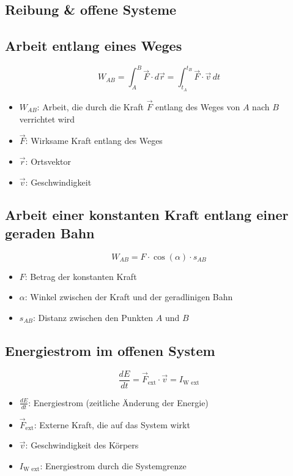 \documentclass[a4paper, 8pt]{extarticle}
\begin{document}
\begin{landscape}
\begin{multicols*}{3}
\section{Reibung
\& offene Systeme}

\subsection{Arbeit entlang eines Weges}
\[
W_{AB} = \int_A^B \vec{F} \cdot d\vec{r} = \int_{t_A}^{t_B} \vec{F} \cdot \vec{v} \, dt
\]
{\footnotesize
\begin{itemize}
    \item \( W_{AB} \): Arbeit, die durch die Kraft \( \vec{F} \) entlang des Weges von \( A \) nach \( B \) verrichtet wird
    \item \( \vec{F} \): Wirksame Kraft entlang des Weges
    \item \( \vec{r} \): Ortsvektor
    \item \( \vec{v} \): Geschwindigkeit
\end{itemize}
}

\subsection{Arbeit einer konstanten Kraft entlang einer geraden Bahn}
\[
W_{AB} = F \cdot \cos(\alpha) \cdot s_{AB}
\]
{\footnotesize
\begin{itemize}
    \item \( F \): Betrag der konstanten Kraft
    \item \( \alpha \): Winkel zwischen der Kraft und der geradlinigen Bahn
    \item \( s_{AB} \): Distanz zwischen den Punkten \( A \) und \( B \)
\end{itemize}
}

\subsection{Energiestrom im offenen System}
\[
\frac{dE}{dt} = \vec{F}_{\text{ext}} \cdot \vec{v} = I_{\text{W ext}}
\]
{\footnotesize
\begin{itemize}
    \item \( \frac{dE}{dt} \): Energiestrom (zeitliche Änderung der Energie)
    \item \( \vec{F}_{\text{ext}} \): Externe Kraft, die auf das System wirkt
    \item \( \vec{v} \): Geschwindigkeit des Körpers
    \item \( I_{\text{W ext}} \): Energiestrom durch die Systemgrenze
\end{itemize}
}


\end{multicols*}
\end{landscape}
\end{document}
